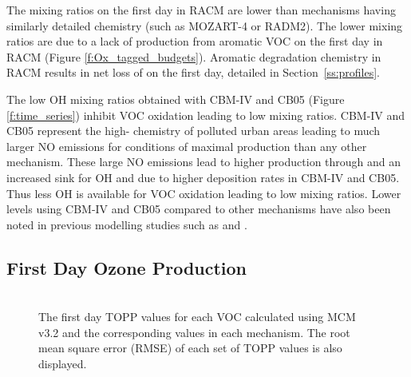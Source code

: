 The  mixing ratios on the first day in RACM are lower than mechanisms having similarly detailed chemistry (such as MOZART-4 or RADM2).
The lower  mixing ratios are due to a lack of  production from aromatic VOC on the first day in RACM (Figure \ref{f:Ox_tagged_budgets}).
Aromatic degradation chemistry in RACM results in net loss of  on the first day, detailed in \mbox{Section \ref{ss:profiles}}.

The low OH mixing ratios obtained with CBM-IV and CB05 (Figure \ref{f:time_series}) inhibit VOC oxidation leading to low  mixing ratios.
CBM-IV and CB05 represent the high- chemistry of polluted urban areas leading to much larger NO emissions for conditions of maximal  production than any other mechanism.
These large NO emissions lead to higher  production through  and an increased sink for OH and  due to higher  deposition rates in CBM-IV and CB05.
Thus less OH is available for VOC oxidation leading to low  mixing ratios.
Lower  levels using CBM-IV and CB05 compared to other mechanisms have also been noted in previous modelling studies such as \citet{Emmerson:2009} and \citet{Saylor:2012}.

\subsection{First Day Ozone Production} \label{ss:day1} %

\begin{figure}
    \centering
    \includegraphics[width=\textwidth]{img/first_day_values}
    \vspace{1mm}
    \caption{The first day TOPP values for each VOC calculated using MCM v3.2 and the corresponding values in each mechanism. The root mean square error (RMSE) of each set of TOPP values is also displayed.}
    \vspace{-4mm}
    \label{f:first_day}
\end{figure}

